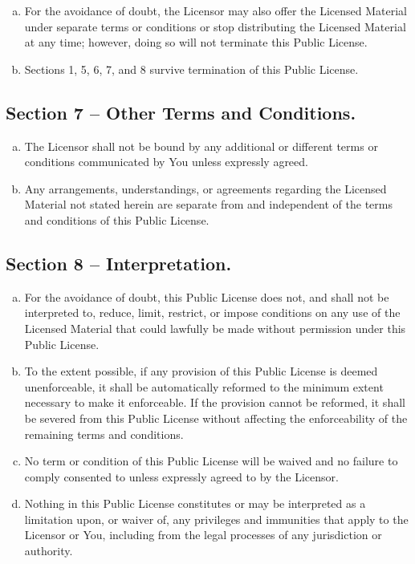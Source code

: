 {\begin{enumerate}[a.]
For the avoidance of doubt, this Section 6(b) does not affect any right the Licensor may have to seek remedies for Your violations of this Public License.

\item For the avoidance of doubt, the Licensor may also offer the Licensed Material under separate terms or conditions or stop distributing the Licensed Material at any time; however, doing so will not terminate this Public License.

\item Sections 1, 5, 6, 7, and 8 survive termination of this Public License.
\end{enumerate}

\subsection*{Section 7 -- Other Terms and Conditions.}

\begin{enumerate}[a.]
\item The Licensor shall not be bound by any additional or different terms or conditions communicated by You unless expressly agreed.
\item Any arrangements, understandings, or agreements regarding the Licensed Material not stated herein are separate from and independent of the terms and conditions of this Public License.
\end{enumerate}

\subsection*{Section 8 -- Interpretation.}

\begin{enumerate}[a.]
\item For the avoidance of doubt, this Public License does not, and shall not be interpreted to, reduce, limit, restrict, or impose conditions on any use of the Licensed Material that could lawfully be made without permission under this Public License.
\item To the extent possible, if any provision of this Public License is deemed unenforceable, it shall be automatically reformed to the minimum extent necessary to make it enforceable. If the provision cannot be reformed, it shall be severed from this Public License without affecting the enforceability of the remaining terms and conditions.
\item No term or condition of this Public License will be waived and no failure to comply consented to unless expressly agreed to by the Licensor.
\item Nothing in this Public License constitutes or may be interpreted as a limitation upon, or waiver of, any privileges and immunities that apply to the Licensor or You, including from the legal processes of any jurisdiction or authority.
\end{enumerate}
}